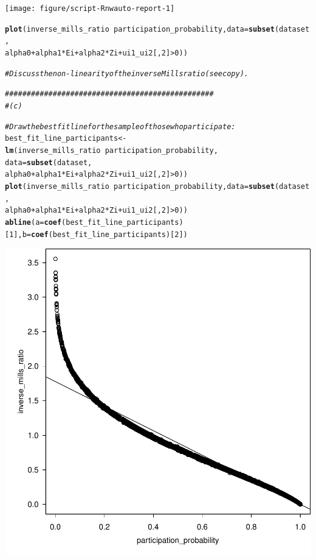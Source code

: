 \documentclass{article}\usepackage[]{graphicx}\usepackage[]{xcolor}
\makeatletter
\newcommand{\hlnum}[1]{\textcolor[rgb]{0.686,0.059,0.569}{#1}}%
\newcommand{\hlcom}[1]{\textcolor[rgb]{0.678,0.584,0.686}{\textit{#1}}}%
\newcommand{\hlopt}[1]{\textcolor[rgb]{0,0,0}{#1}}%
\newcommand{\hldef}[1]{\textcolor[rgb]{0.345,0.345,0.345}{#1}}%
\newcommand{\hlkwb}[1]{\textcolor[rgb]{0.69,0.353,0.396}{#1}}%
\newcommand{\hlkwc}[1]{\textcolor[rgb]{0.333,0.667,0.333}{#1}}%
\newcommand{\hlkwd}[1]{\textcolor[rgb]{0.737,0.353,0.396}{\textbf{#1}}}%
\newenvironment{kframe}{%
 \def\at@end@of@kframe{}%
 \ifinner\ifhmode%
  \def\at@end@of@kframe{\end{minipage}}%
  \begin{minipage}{\columnwidth}%
 \fi\fi%
 \def\FrameCommand##1{\hskip\@totalleftmargin \hskip-\fboxsep
 \colorbox{shadecolor}{##1}\hskip-\fboxsep
     \hskip-\linewidth \hskip-\@totalleftmargin \hskip\columnwidth}%
 \MakeFramed {\advance\hsize-\width
   \@totalleftmargin\z@ \linewidth\hsize
   \@setminipage}}%
 {\par\unskip\endMakeFramed%
 \at@end@of@kframe}
\newenvironment{knitrout}{}{} %
\makeatother
\begin{document}
\begin{knitrout}
{\centering \texttt{[image: figure/script-Rnwauto-report-1]} 

}


\begin{kframe}\begin{alltt}
\hlkwd{plot}\hldef{(inverse_mills_ratio}\hlopt{~}\hldef{participation_probability,} \hlkwc{data}\hldef{=}\hlkwd{subset}\hldef{(dataset,}
                                                    \hldef{alpha0}\hlopt{+}\hldef{alpha1}\hlopt{*}\hldef{Ei}\hlopt{+}\hldef{alpha2}\hlopt{*}\hldef{Zi}\hlopt{+}\hldef{ui1_ui2[,}\hlnum{2}\hldef{]}\hlopt{>}\hlnum{0}\hldef{))}

\hlcom{# Discuss the non-linearity of the inverse Mills ratio (see copy).}

\hlcom{################################################}
\hlcom{# (c)}

\hlcom{# Draw the best fit line for the sample of those who participate:}
\hldef{best_fit_line_participants} \hlkwb{<-} \hlkwd{lm}\hldef{(inverse_mills_ratio}\hlopt{~}\hldef{participation_probability,}
                                 \hlkwc{data}\hldef{=}\hlkwd{subset}\hldef{(dataset,}
                                 \hldef{alpha0}\hlopt{+}\hldef{alpha1}\hlopt{*}\hldef{Ei}\hlopt{+}\hldef{alpha2}\hlopt{*}\hldef{Zi}\hlopt{+}\hldef{ui1_ui2[,}\hlnum{2}\hldef{]}\hlopt{>}\hlnum{0}\hldef{))}
\hlkwd{plot}\hldef{(inverse_mills_ratio}\hlopt{~}\hldef{participation_probability,} \hlkwc{data}\hldef{=}\hlkwd{subset}\hldef{(dataset,}
                                                    \hldef{alpha0}\hlopt{+}\hldef{alpha1}\hlopt{*}\hldef{Ei}\hlopt{+}\hldef{alpha2}\hlopt{*}\hldef{Zi}\hlopt{+}\hldef{ui1_ui2[,}\hlnum{2}\hldef{]}\hlopt{>}\hlnum{0}\hldef{))}
\hlkwd{abline}\hldef{(}\hlkwc{a}\hldef{=}\hlkwd{coef}\hldef{(best_fit_line_participants)[}\hlnum{1}\hldef{],} \hlkwc{b}\hldef{=}\hlkwd{coef}\hldef{(best_fit_line_participants)[}\hlnum{2}\hldef{])}
\end{alltt}
\end{kframe}

{\centering \includegraphics[width=.6\linewidth]{figure/script-Rnwauto-report-2} 

}
\end{knitrout}
\end{document}
